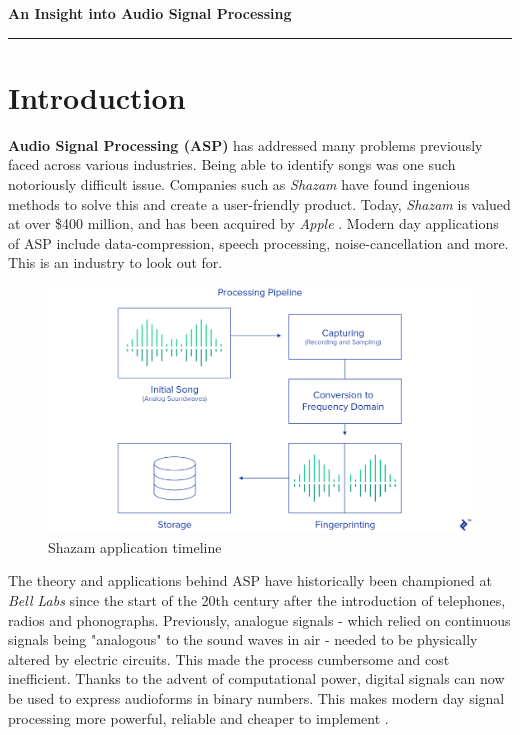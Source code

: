 \documentclass[a4paper,12pt]{article}
\begin{document}
    \newpage
    
\begin{center}
\Large
\textbf{An Insight into Audio Signal Processing}
\end{center}

\begin{center}\rule{0.9\linewidth}{0.5pt}\end{center}

\normalsize
\section{Introduction}
\textbf{Audio Signal Processing (ASP)} has addressed many problems previously faced across various industries. Being able to identify songs was one such notoriously difficult issue.
Companies such as \textit{Shazam} have found ingenious methods to solve this and create a user-friendly product. Today, \textit{Shazam} is valued at over \$400 million,
and has been acquired by \textit{Apple} \parencite{BBCvaluation}. Modern day applications of ASP include data-compression, speech processing, noise-cancellation and more.
This is an industry to look out for.

\begin{figure}[h!]
    \includegraphics[width=16cm]{shazamdemo.png}
    \centering
    \caption{Shazam application timeline \parencite{ShazamASP}}
    \end{figure}

The theory and applications behind ASP have historically been championed at \textit{Bell Labs}
since the start of the 20th century after the introduction of telephones, radios and phonographs. 
Previously, analogue signals - which relied on continuous signals being "analogous" to the sound waves in air - needed to be
physically altered by electric circuits. This made the process cumbersome and cost inefficient. Thanks to the advent of computational power, digital signals can now be used to express
audioforms in binary numbers. This makes modern day signal processing more powerful, reliable and cheaper to implement \parencite{Udo1997}.
\newline
\end{document}
